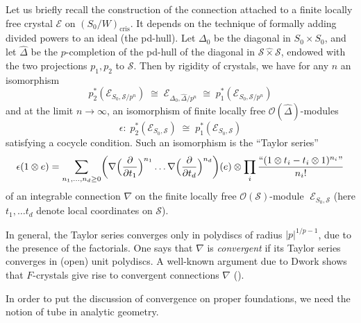 \begin{para}\label{para:3.4.2}
 Let us briefly recall the construction of the connection attached to a
 finite locally free crystal $\mathcal{E}$ on
 $(S_0/W)_{\mathrm{cris}}$. It depends on the technique of formally
 adding divided powers to an ideal (the pd-hull). Let $\Delta_0$ be the
 diagonal in $S_0\times S_0$, and let $\hat\Delta$ be the $p$-completion
 of the pd-hull of the diagonal in $\mathcal{S}\hat\times\mathcal{S}$,
 endowed with the two projections $p_1,p_2$ to $\mathcal{S}$. Then by
 rigidity of crystals, we have for any $n$ an isomorphism
 \begin{equation*}
  p_2^\ast(\mathcal{E}_{S_0,\mathcal{S}/p^n})\;\cong
   \;\mathcal{E}_{\Delta_0,\hat\Delta/p^n}\;\cong
   \;p_1^\ast(\mathcal{E}_{S_0,\mathcal{S}/p^n})
 \end{equation*}
 and at the limit $n\rightarrow \infty$, an isomorphism of finite
 locally free $\mathcal{O}({\hat\Delta})$-modules  
 \begin{equation*}
  \epsilon:\; p_2^\ast(\mathcal{E}_{S_0,\mathcal{S}})\;\cong
   \;p_1^\ast(\mathcal{E}_{S_0,\mathcal{S}})
 \end{equation*}
 satisfying a cocycle condition. Such an isomorphism is the ``Taylor series'' 
 \begin{equation*}
  \epsilon(1\otimes e) = \sum_{n_1,\ldots,n_d\geq
   0}\biggl(\nabla\Bigl(\frac{\partial}{\partial t_1}\Bigr)^{n_1}
   \ldots\nabla\Bigl(\frac{\partial}{\partial t_d}\Bigr)^{n_d}\biggr)(e)
   \otimes \prod_i \frac{\text{``$(1\otimes t_i-t_i\otimes 1)^{n_i}$''}}{n_i!}
 \end{equation*}
 of an integrable connection $\nabla$ on the finite
 locally free $\mathcal{O}(\mathcal{S})$-module
 $\;\mathcal{E}_{S_0,\mathcal{S}}$ (here $t_1,\ldots t_d$ denote local
 coordinates on $\mathcal{S}$).
\end{para}

\begin{para}\label{para:3.4.3}
 In general, the Taylor series converges only in polydiscs of radius
 $| p |^{1/p-1}$, due to the presence of the factorials. One
 says that $\nabla$ is {\it convergent} if its Taylor series converges
 in (open) unit polydiscs. A well-known argument due to Dwork shows that
 $F$-crystals give rise to convergent connections $\nabla$ (\cite{tdd}).

 In order to put the discussion of convergence on proper foundations, we
 need the notion of tube in analytic geometry.
\end{para}


